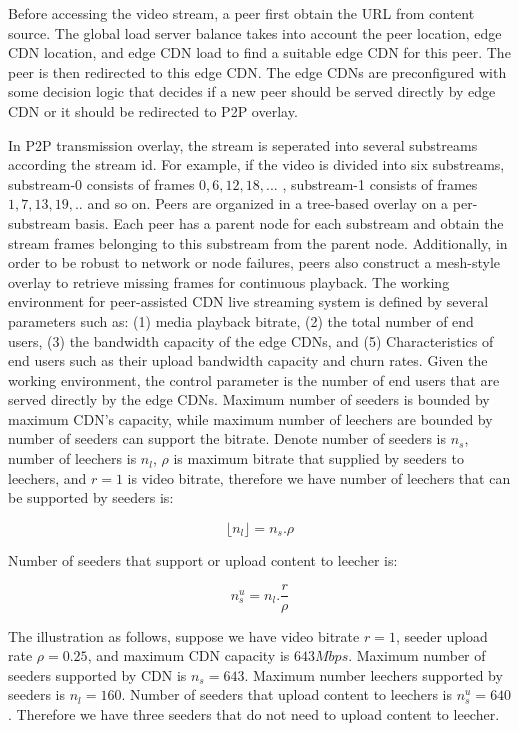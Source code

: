 \documentclass[conference]{IEEEtran}
\begin{document}
Before accessing the video stream, a peer first obtain the URL from content source.  
The global load server balance takes into account the peer location, edge CDN location, and edge CDN load to find a suitable edge CDN for this peer.
The peer is then redirected to this edge CDN.
The edge CDNs are preconfigured with some decision logic that decides if a new peer should be served directly by edge CDN or it should be redirected to P2P overlay.

In P2P transmission overlay, the stream is seperated into several substreams according the stream id.
For example, if the video is divided into six substreams, substream-0 consists of frames $0,6,12,18,...$ , substream-1 consists of frames $1,7,13,19,..$ and so on. 
Peers are organized in a tree-based overlay on a per-substream basis.
Each peer has a parent node for each substream and obtain the stream frames belonging to this substream from the parent node. 
Additionally, in order to be robust to network or node failures, peers also construct a mesh-style overlay to retrieve missing frames for continuous playback.
The working environment for peer-assisted CDN live streaming system is defined by several parameters such as: (1) media playback bitrate, (2) the total number of end users, (3) the bandwidth capacity of the edge CDNs, and (5) Characteristics of end users such as their upload bandwidth capacity and churn rates. 
Given the working environment, the control parameter is the number of end users that are served directly by the edge CDNs.
Maximum number of seeders is bounded by maximum CDN's capacity, while maximum number of leechers are bounded by number of seeders can support the bitrate.
Denote number of seeders is $n_s$, number of leechers is $n_l$, $\rho$ is maximum bitrate that supplied by seeders to leechers, and $r=1$ is video bitrate, therefore we have number of leechers that can be supported by seeders is:

\begin{equation}\label{eqn:leecher}
	\lfloor n_l \rfloor = n_s . \rho
\end{equation}

Number of seeders that support or upload content to leecher is:

\begin{equation}\label{eqn:seeders-to-leechers}
	n_{s}^{u} = n_l . \frac{r}{\rho}
\end{equation}

The illustration as follows, suppose we have video bitrate $r=1$, seeder upload rate $\rho=0.25$, and maximum CDN capacity is $643Mbps$. 
Maximum number of seeders supported by CDN is $n_s=643$.
Maximum number leechers supported by seeders is $n_l=160$.  
Number of seeders that upload content to leechers is $n_{s}^{u}=640$.  
Therefore we have three seeders that do not need to upload content to leecher. 
\end{document}
